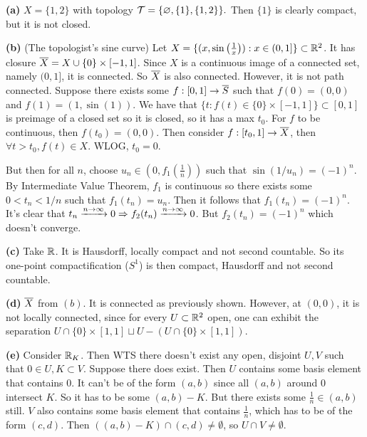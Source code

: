 \documentclass[a4paper, 10pt]{article}
\begin{document}
\begin{solution}
    \textbf{(a)} $X = \{1, 2\}$ with topology $\mathcal{T} = \{\varnothing, \{1\}, \{1, 2\}\}.$ Then $\{1\}$ is clearly compact, but it is not closed.

    \textbf{(b)} (The topologist's sine curve) Let $X = \{(x, \sin\left(\frac{1}{x}\right)) : x \in (0, 1]\} \subset \mathbb{R}^2$. It has closure $\overline{X} = X \cup \{0\} \times [-1, 1]$. Since $X$ is a continuous image of a connected set, namely $(0, 1]$, it is connected. So $\overline{X}$ is also connected. However, it is not path connected. Suppose there exists some $f: [0, 1] \to \overline{S}$ such that $f(0) = (0, 0)$ and $f(1) = (1, \sin(1))$. We have that $\{t : f(t) \in \{0\} \times [-1, 1]\} \subset [0, 1]$ is preimage of a closed set so it is closed, so it has a max $t_0$. For $f$ to be continuous, then $f(t_0) = (0, 0)$. Then consider $f: [t_0, 1] \to \overline{X}$, then $\forall t > t_0, f(t) \in X$. WLOG, $t_0 = 0$. 

    But then for all $n$, choose $u_n \in (0, f_1(\frac{1}{n}))$ such that $\sin(1/u_n) = (-1)^n$. By Intermediate Value Theorem, $f_1$ is continuous so there exists some $0 < t_n < 1/n$ such that $f_1(t_n) = u_n$. Then it follows that $f_1(t_n) = (-1)^n$. It's clear that $t_n \xrightarrow{n \to \infty} 0 \Rightarrow f_2(t_n) \xrightarrow{n \to \infty} 0$. But $f_2(t_n) = (-1)^n$ which doesn't converge. \contra

    \textbf{(c)} Take $\mathbb{R}$. It is Hausdorff, locally compact and not second countable. So its one-point compactification ($S^1$) is then compact, Hausdorff and not second countable.

    \textbf{(d)} $\overline{X}$ from $(b)$. It is connected as previously shown. However, at $(0, 0)$, it is not locally connected, since for every $U \subset \mathbb{R}^2$ open, one can exhibit the separation $U \cap \{0\} \times [1, 1] \sqcup U - (U \cap \{0\} \times [1, 1])$.

    \textbf{(e)} Consider $\mathbb{R}_K$. Then WTS there doesn't exist any open, disjoint $U, V$ such that $0 \in U, K \subset V$. Suppose there does exist. Then $U$ contains some basis element that contains $0$. It can't be of the form $(a, b)$ since all $(a, b)$ around 0 intersect $K$. So it has to be some $(a, b) - K$. But there exists some $\frac{1}{n} \in (a, b)$ still. $V$ also contains some basis element that contains $\frac{1}{n}$, which has to be of the form $(c, d)$. Then $((a, b) - K) \cap  (c,d) \neq \emptyset$, so $U \cap V \neq \emptyset$.
\end{solution}
\end{document}
